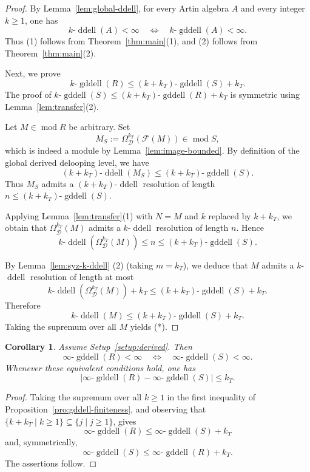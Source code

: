 \documentclass[12pt,a4paper,reqno]{amsart}
\theoremstyle{plain}
\newtheorem{corollary}[theorem]{Corollary}
\theoremstyle{definition}
\theoremstyle{remark}
\DeclareMathOperator{\modd}{mod}
\DeclareMathOperator{\ddell}{ddell}
\DeclareMathOperator{\gddell}{gddell}
\newcommand{\syz}{\Omega_{\mathcal{D}}}
\begin{document}
\begin{proof}
By Lemma~\ref{lem:global-ddell}, for every Artin algebra $A$ and
every integer $k\geq 1$, one has
\[
k\text{-}\ddell(A)<\infty
\quad\Longleftrightarrow\quad
k\text{-}\gddell(A)<\infty.
\]
Thus (1) follows from Theorem~\ref{thm:main}(1), and (2) follows
from Theorem~\ref{thm:main}(2). 

Next, we prove \[k\text{-}\gddell(R) \le (k+k_T)\text{-}\gddell(S) +k_T.\tag{*}\]  The proof of $k\text{-}\gddell(S) \le (k+k_T)\text{-}\gddell(R) +k_T $ is symmetric  using Lemma~\ref{lem:transfer}(2). 

Let $M \in \modd R$ be arbitrary. Set 
\[
M_S := \syz^{k_T}(\mathcal{F}(M)) \in \modd S,
\]
which is indeed a module by Lemma~\ref{lem:image-bounded}. By definition of the global derived delooping level, we have
\[
(k+k_T)\text{-}\ddell(M_S) \le (k+k_T)\text{-}\gddell(S).
\]
Thus $M_S$ admits a $(k+k_T)$-$\ddell$ resolution of length $n \le (k+k_T)\text{-}\gddell(S)$.

Applying Lemma~\ref{lem:transfer}(1) with $N = M$ and $k$ replaced by $k+k_T$, we obtain that $\syz^{k_T}(M)$ admits a $k$-$\ddell$ resolution of length $n$. Hence
\[
k\text{-}\ddell(\syz^{k_T}(M)) \le n \le (k+k_T)\text{-}\gddell(S).
\]

By Lemma~\ref{lem:syz-k-ddell} (2) (taking $m = k_T$), we deduce that $M$ admits a $k$-$\ddell$ resolution of length at most
\[
k\text{-}\ddell(\syz^{k_T}(M)) + k_T \le (k+k_T)\text{-}\gddell(S) + k_T.
\]
Therefore
\[
k\text{-}\ddell(M) \le (k+k_T)\text{-}\gddell(S) + k_T.
\]
Taking the supremum over all $M$ yields (*). 
\end{proof}
\begin{corollary}\label{cor:gddell-finiteness}
Assume Setup~\ref{setup:derived}. Then
\[
\infty\text{-}\gddell(R)<\infty
\quad\Longleftrightarrow\quad
\infty\text{-}\gddell(S)<\infty.
\]
Whenever these equivalent conditions hold, one has
\[
\left|
\infty\text{-}\gddell(R)
-
\infty\text{-}\gddell(S)
\right|
\leq k_T.
\]
\end{corollary}

\begin{proof}
Taking the supremum over all $k\geq1$ in the first inequality of
Proposition~\ref{pro:gddell-finiteness}, and observing that
$\{k+k_T\mid k\geq1\}\subseteq\{j\mid j\geq1\}$, gives
\[
\infty\text{-}\gddell(R)
\leq
\infty\text{-}\gddell(S)+k_T
\]
and, symmetrically,
\[
\infty\text{-}\gddell(S)
\leq
\infty\text{-}\gddell(R)+k_T.
\]
The assertions follow.
\end{proof}
\end{document}
